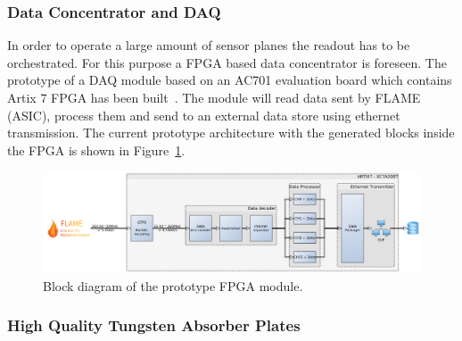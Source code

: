 \subsubsection{Data Concentrator and DAQ}

In order to operate a large amount of sensor planes the readout has to be orchestrated.
For this purpose a FPGA based data concentrator is foreseen.
The prototype  of  a DAQ  module  based on an AC701 evaluation board which contains Artix 7 FPGA  has been built~\cite{2017SPIE10445E..4HD}.
The module will read data sent by FLAME (ASIC), process  them and  send  to an external data store using ethernet transmission. 
The current prototype architecture with the generated blocks inside the FPGA is shown in Figure~\ref{fig:FPGA_scheme}. 

\begin{figure}[hbp]
\centering
    \includegraphics[width=\textwidth]{Calorimeter/FCAL/figs/FPGA_scheme} 
	\caption{Block diagram of the prototype FPGA module.}
    \label{fig:FPGA_scheme}
\end{figure}

\subsubsection{High Quality Tungsten Absorber Plates}

